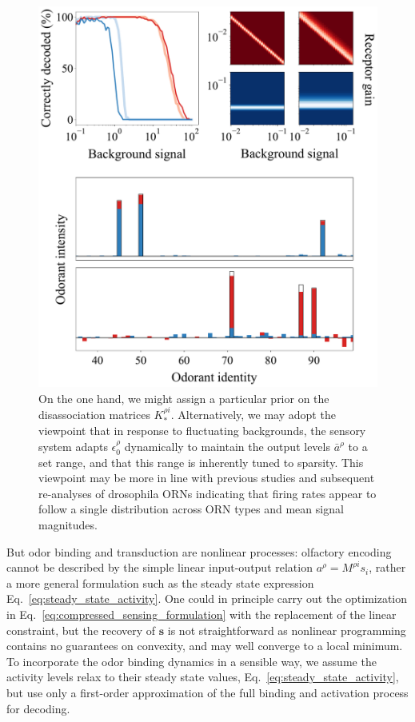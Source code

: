 \documentclass[9pt,twocolumn,twoside]{pnas-new}
\begin{document}
\begin{figure}%
	\centering
	\includegraphics[width=.95\linewidth]{figures/signal_decoding_weber_law/signal_decoding_weber_law}
	\caption{On the one hand, we might assign a particular prior on the disassociation matrices $K_*^{\rho i}$. Alternatively, we may adopt the viewpoint that in response to fluctuating backgrounds, the sensory system adapts $\epsilon^\rho_0$ dynamically to maintain the output levels $\bar a^\rho$ to a set range, and that this range is inherently tuned to sparsity. This viewpoint may be more in line with previous studies and subsequent re-analyses of drosophila ORNs indicating that firing rates appear to follow a single distribution across ORN types and mean signal magnitudes. 
	}
	\label{fig:frog}
\end{figure}

But odor binding and transduction are nonlinear processes: olfactory encoding cannot be described by the simple linear input-output relation $a^\rho = M^{\rho i} s_i$, rather a more general formulation such as the steady state expression Eq.~\ref{eq:steady_state_activity}. One could in principle carry out the optimization in Eq.~\ref{eq:compressed_sensing_formulation} with the replacement of the linear constraint,  but the recovery of $\mathbf s$ is not straightforward as nonlinear programming contains no guarantees on convexity, and may well converge to a local minimum. To incorporate the odor binding dynamics in a sensible way, we assume the activity levels relax to their steady state values, Eq.~\ref{eq:steady_state_activity}, but use only a first-order approximation of the full binding and activation process for decoding. 
\end{document}
